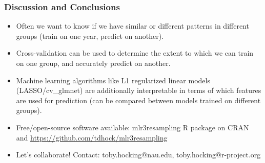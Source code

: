 \documentclass{beamer}
\begin{document}
\begin{frame}
  \frametitle{Discussion and Conclusions}
  \begin{itemize}
  \item Often we want to know if we have similar or different patterns
    in different groups (train on one year, predict
    on another).
  \item Cross-validation can be used to determine the extent to which
    we can train on one group, and accurately predict on another.
  \item Machine learning algorithms like L1 regularized linear models
    (LASSO/cv\_glmnet) are additionally interpretable in terms of which features
    are used for prediction (can be compared between models trained on
    different groups).
  \item Free/open-source software available: mlr3resampling R package
    on CRAN and \url{https://github.com/tdhock/mlr3resampling}
  \item Let's collaborate! Contact: toby.hocking@nau.edu,
    toby.hocking@r-project.org
  \end{itemize}
\end{frame}
\end{document}
